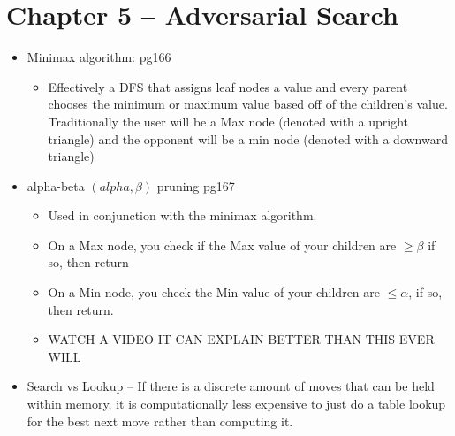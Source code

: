 \documentclass{article}
\begin{document}
\section*{Chapter 5 -- Adversarial Search}
\begin{itemize}
	\item Minimax algorithm: pg166
	\begin{itemize}
		\item Effectively a DFS that assigns leaf nodes a value and every parent chooses the minimum or maximum value based off of the children's value. Traditionally the user will be a Max node (denoted with a upright triangle) and the opponent will be a min node (denoted with a downward triangle)
	\end{itemize}
	\item alpha-beta $(alpha, \beta)$ pruning pg167
	\begin{itemize}
		\item Used in conjunction with the minimax algorithm. 
		\item On a Max node, you check if the Max value of your children are $\geq \beta$ if so, then return 
		\item On a Min node, you check the Min value of your children are $\leq \alpha$, if so, then return.
		\item WATCH A VIDEO IT CAN EXPLAIN BETTER THAN THIS EVER WILL
	\end{itemize}
	\item Search vs Lookup -- If there is a discrete amount of moves that can be held within memory, it is computationally less expensive to just do a table lookup for the best next move rather than computing it.
\end{itemize}
\end{document}
